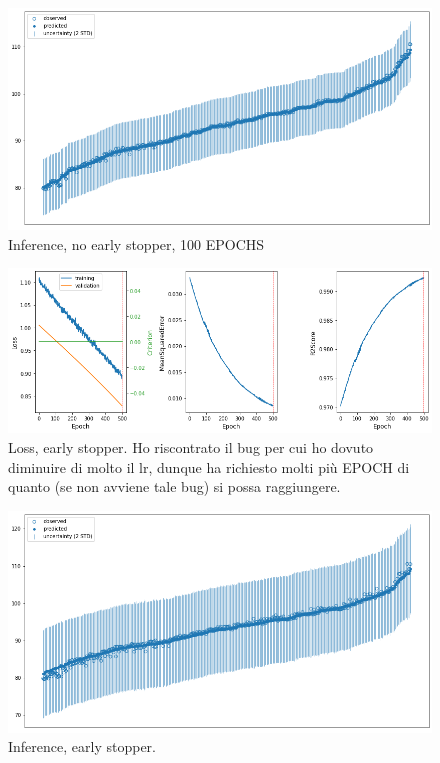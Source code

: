 \begin{figure}[h]
    \centering
    \includegraphics[width=1\textwidth]{images/Training - temp/MAP - inference.png}
    \caption{Inference, no early stopper, 100 EPOCHS}
\end{figure}

\newpage

\begin{figure}[h]
    \centering
    \includegraphics[width=1\textwidth]{images/Training - temp/MAP - loss - early stopper.png}
    \caption{Loss, early stopper. Ho riscontrato il bug per cui ho dovuto diminuire di molto il lr, dunque ha richiesto molti più EPOCH di quanto (se non avviene tale bug) si possa raggiungere.}
\end{figure}

\newpage

\begin{figure}[h]
    \centering
    \includegraphics[width=1\textwidth]{images/Training - temp/MAP - inference - early stopper.png}
    \caption{Inference, early stopper.}
\end{figure}

